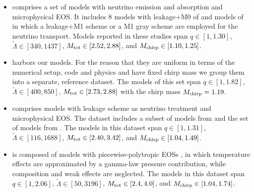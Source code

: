 \begin{itemize}
    \item \DSheatcool{} comprises a set of models with neutrino emission 
    and absorption and microphysical \ac{EOS}. It includes 
    $8$ models with leakage+M0 of \citet{Radice:2018pdn} and models 
    of \citet{Sekiguchi:2015dma,Sekiguchi:2016bjd,Vincent:2019kor}
    in which a leakage+M1 scheme or a M1 gray scheme are employed for the neutrino transport. 
    Models reported in these studies span 
    $q\in[1, 1.30]$, 
    $\tilde{\Lambda}\in[340, 1437]$, 
    $M_{\rm tot}\in[2.52,2.88]$, 
    and $M_{\rm chirp}\in[1.10,1.25]$.
    \item \DSrefset{} harbors our models. 
    For the reason that they are uniform in terms of the 
    numerical setup, code and physics and have fixed chirp mass 
    we group them into a separate, reference dataset. 
    The models of this set span $q\in[1, 1.82]$, 
    $\tilde{\Lambda}\in[400, 850]$, 
    $M_{\rm tot}\in[2.73,2.88]$ with 
    the chirp mass $M_{\rm chirp}=1.19$.
    \item \DScool{} comprises models with leakage scheme as neutrino treatment and 
    microphysical \ac{EOS}. The dataset includes a subset of models from 
    \citet{Radice:2018pdn} %
    and the set of models from \citet{Lehner:2016lxy}.
    The models in this dataset span $q\in[1, 1.31]$, 
    $\tilde{\Lambda}\in[116, 1688]$, 
    $M_{\rm tot}\in[2.40,3.42]$, 
    and $M_{\rm chirp}\in[1.04,1.49]$.
    \item \DSnone{} is composed of models with piecewise-polytropic \acp{EOS} 
    \citet{Hotokezaka:2012ze,Dietrich:2015iva,Dietrich:2016hky,
        Kiuchi:2019lls,Bauswein:2013yna},
    in which temperature effects are approximated by a
    gamma-law pressure contribution, while
    composition and weak effects are neglected.
    The models in this dataset span 
    $q\in[1, 2.06]$, 
    $\tilde{\Lambda}\in[50, 3196]$, 
    $M_{\rm tot}\in[2.4,4.0]$, 
    and $M_{\rm chirp}\in[1.04,1.74]$.
\end{itemize}

